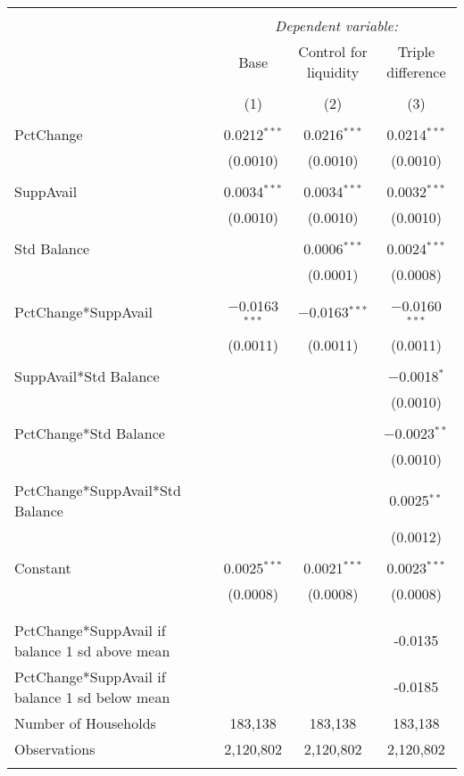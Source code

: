 
\begin{tabular}{@{\extracolsep{5pt}}lccc} 
\\[-1.8ex]\toprule 
\toprule \\[-1.8ex] 
 & \multicolumn{3}{c}{\textit{Dependent variable:}} \\ 
\cmidrule{2-4} 
 & Base & Control for liquidity & Triple difference \\ 
\\[-1.8ex] & (1) & (2) & (3)\\ 
\midrule \\[-1.8ex] 
 PctChange & 0.0212$^{***}$ & 0.0216$^{***}$ & 0.0214$^{***}$ \\ 
  & (0.0010) & (0.0010) & (0.0010) \\ 
  & & & \\ 
 SuppAvail & 0.0034$^{***}$ & 0.0034$^{***}$ & 0.0032$^{***}$ \\ 
  & (0.0010) & (0.0010) & (0.0010) \\ 
  & & & \\ 
 Std Balance &  & 0.0006$^{***}$ & 0.0024$^{***}$ \\ 
  &  & (0.0001) & (0.0008) \\ 
  & & & \\ 
 PctChange*SuppAvail & $-$0.0163$^{***}$ & $-$0.0163$^{***}$ & $-$0.0160$^{***}$ \\ 
  & (0.0011) & (0.0011) & (0.0011) \\ 
  & & & \\ 
 SuppAvail*Std Balance &  &  & $-$0.0018$^{*}$ \\ 
  &  &  & (0.0010) \\ 
  & & & \\ 
 PctChange*Std Balance &  &  & $-$0.0023$^{**}$ \\ 
  &  &  & (0.0010) \\ 
  & & & \\ 
 PctChange*SuppAvail*Std Balance &  &  & 0.0025$^{**}$ \\ 
  &  &  & (0.0012) \\ 
  & & & \\ 
 Constant & 0.0025$^{***}$ & 0.0021$^{***}$ & 0.0023$^{***}$ \\ 
  & (0.0008) & (0.0008) & (0.0008) \\ 
  & & & \\ 
\midrule \\[-1.8ex] 
PctChange*SuppAvail if balance 1 sd above mean &  &  & -0.0135 \\ 
PctChange*SuppAvail if balance 1 sd below mean &  &  & -0.0185 \\ 
Number of Households & 183,138 & 183,138 & 183,138 \\ 
Observations & 2,120,802 & 2,120,802 & 2,120,802 \\ 
\bottomrule \\[-1.8ex] 
\end{tabular} 

